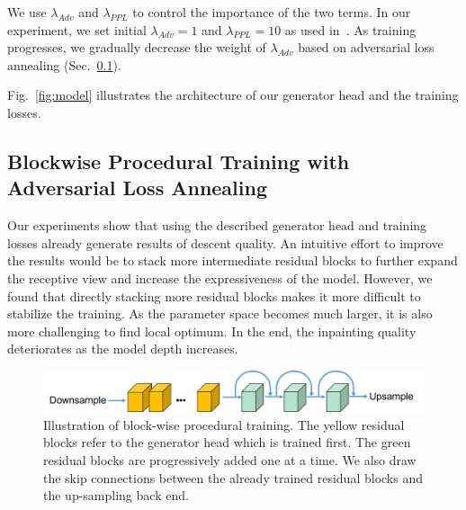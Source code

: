 We use $\lambda_{Adv}$ and $\lambda_{PPL}$ to control the importance of the two terms. In our experiment, we set initial $\lambda_{Adv}=1$ and $\lambda_{PPL}=10$ as used in~\cite{pathak2016context,wang2017high}. As training progresses, we gradually decrease the weight of $\lambda_{Adv}$ based on adversarial loss annealing (Sec.~\ref{sec:procedural}).

Fig.~\ref{fig:model} illustrates the architecture of our generator head and the training losses.

\subsection{Blockwise Procedural Training with Adversarial Loss Annealing}
\label{sec:procedural}
Our experiments show that using the described generator head and training losses already generate results of descent quality. An intuitive effort to improve the results would be to stack more intermediate residual blocks to further expand the receptive view and increase the expressiveness of the model. However, we found that directly stacking more residual blocks makes it more difficult to stabilize the training. As the parameter space becomes much larger, it is also more challenging to find local optimum. In the end, the inpainting quality deteriorates as the model depth increases.

\begin{figure}[t]
\centering
\small
\includegraphics[width=1\textwidth]{figures/proc.pdf}
\caption{Illustration of block-wise procedural training. The yellow residual blocks refer to the generator head which is trained first. The green residual blocks are progressively added one at a time. We also draw the skip connections between the already trained residual blocks and the up-sampling back end.}
\label{fig:proc}
\vspace{-20pt}
\end{figure}

